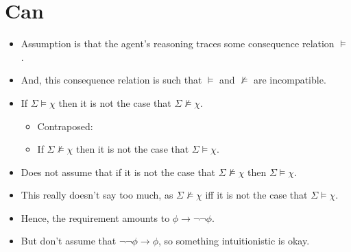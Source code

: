 \documentclass[10pt]{article}
\begin{document}
\newpage

\section{Can}
\label{sec:can-1}

\begin{itemize}
\item Assumption is that the agent's reasoning traces some consequence relation \(\vDash\).
\item And, this consequence relation is such that \(\vDash\) and \(\nvDash\) are incompatible.
\item If \(\Sigma \vDash \chi\) then it is not the case that \(\Sigma \nvDash \chi\).
  \begin{itemize}
  \item Contraposed:
  \item If \(\Sigma \nvDash \chi\) then it is not the case that \(\Sigma \vDash \chi\).
  \end{itemize}
\item Does not assume that if it is not the case that \(\Sigma \nvDash \chi\) then \(\Sigma \vDash \chi\).
\item This really doesn't say too much, as \(\Sigma \nvDash \chi\) iff it is not the case that \(\Sigma \vDash \chi\).
\item Hence, the requirement amounts to \(\phi \rightarrow \lnot\lnot\phi\).
\item But don't assume that \(\lnot\lnot\phi \rightarrow \phi\), so something intuitionistic is okay.
\end{itemize}
\end{document}
